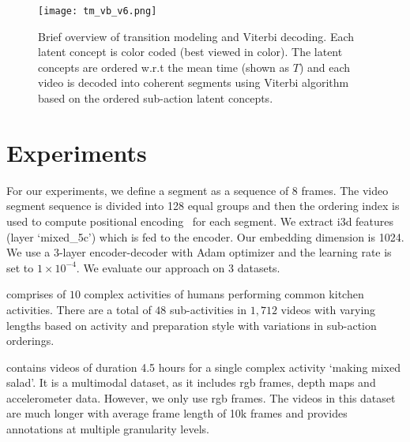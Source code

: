 \documentclass[final]{cvpr}
\begin{document}
\begin{figure}[t]
  \texttt{[image: tm\_vb\_v6.png]}
  
\caption{{\small Brief overview of transition modeling and Viterbi decoding. Each latent concept is color coded (best viewed in color). The latent concepts are ordered w.r.t the mean time (shown as $T$) and each video is decoded into coherent segments using Viterbi algorithm based on the ordered sub-action latent concepts.
}}
\vspace{-0.3cm}
\label{fig:tmvb}
\end{figure}

\section{Experiments}
\label{sec:exp}

For our experiments, we define a segment as a sequence of 8 frames. The video segment sequence is divided into 128 equal groups and then the ordering index is used to compute positional encoding~\cite{vaswani2017attention} for each segment. We extract {\sc i3d} features (layer `mixed\_5c') which is fed to the encoder. Our embedding dimension is 1024. We use a 3-layer encoder-decoder with Adam optimizer and the learning rate is set to $1 \times 10 ^{-4}$. We evaluate our approach on 3 datasets.


 comprises of $10$ complex activities of humans performing common kitchen activities. There are a total of $48$ sub-activities in $1,712$ videos with varying lengths based on activity and preparation style with variations in sub-action orderings.

 contains videos of duration 4.5 hours for a single complex activity `making mixed salad'. 
It is a multimodal dataset, as it includes {\sc rgb} frames, depth maps and accelerometer data. However, we only use {\sc rgb} frames.
The videos in this dataset are much longer with average frame length of 10k frames and provides annotations at multiple granularity levels. 
\end{document}
